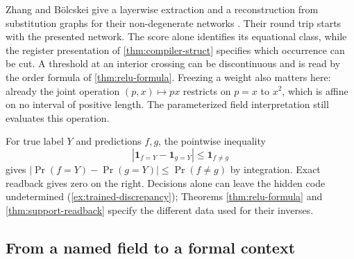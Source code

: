 \documentclass[11pt,a4paper]{article}
\theoremstyle{definition}
\theoremstyle{remark}\newaliascnt{remark}{theorem}
\numberwithin{equation}{section}
\begin{document}
Zhang and B\"olcskei give a layerwise extraction and a reconstruction from substitution graphs for their non-degenerate networks \cite[Proposition 5 and Section 6.2]{zhang-bolcskei-mv}. Their round trip starts with the presented network. The score alone identifies its equational class, while the register presentation of \cref{thm:compiler-struct} specifies which occurrence can be cut. A threshold at an interior crossing can be discontinuous and is read by the order formula of \cref{thm:relu-formula}. Freezing a weight also matters here: already the joint operation \((p,x)\mapsto px\) restricts on \(p=x\) to \(x^2\), which is affine on no interval of positive length. The parameterized field interpretation still evaluates this operation.

For true label \(Y\) and predictions \(f,g\), the pointwise inequality
\[
 |\mathbf1_{f=Y}-\mathbf1_{g=Y}|\le\mathbf1_{f\ne g}
\]
gives \(|\Pr(f=Y)-\Pr(g=Y)|\le\Pr(f\ne g)\) by integration. Exact readback gives zero on the right. Decisions alone can leave the hidden code undetermined (\cref{ex:trained-discrepancy}); Theorems \ref{thm:relu-formula} and \ref{thm:support-readback} specify the different data used for their inverses.

\subsection{From a named field to a formal context}
\end{document}
